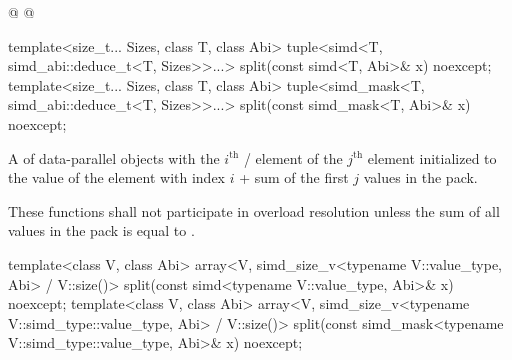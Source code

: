 \begin{wgBRem}
\begin{itemdescr}
  \pnum{}
\end{itemdescr}

\begin{itemdecl}
@%
@
\end{itemdecl}

\begin{itemdescr}
  \pnum{}

  \pnum{}
\end{itemdescr}
\end{wgBRem}

\begin{itemdecl}
template<size_t... Sizes, class T, class Abi>
  tuple<simd<T, simd_abi::deduce_t<T, Sizes>>...>
    split(const simd<T, Abi>& x) noexcept;
template<size_t... Sizes, class T, class Abi>
  tuple<simd_mask<T, simd_abi::deduce_t<T, Sizes>>...>
    split(const simd_mask<T, Abi>& x) noexcept;
\end{itemdecl}

\begin{itemdescr}
  \pnum\returns
  A  of data-parallel objects with the $i^\text{th}$ / element of the $j^\text{th}$  element initialized to the value of the element  with index $i$ + sum of the first $j$ values in the  pack.

  \pnum\remarks
  These functions shall not participate in overload resolution unless the sum of all values in the  pack is equal to .
\end{itemdescr}

\begin{itemdecl}
template<class V, class Abi>
  array<V, simd_size_v<typename V::value_type, Abi> / V::size()>
    split(const simd<typename V::value_type, Abi>& x) noexcept;
template<class V, class Abi>
  array<V, simd_size_v<typename V::simd_type::value_type, Abi> / V::size()>
    split(const simd_mask<typename V::simd_type::value_type, Abi>& x) noexcept;
\end{itemdecl}

